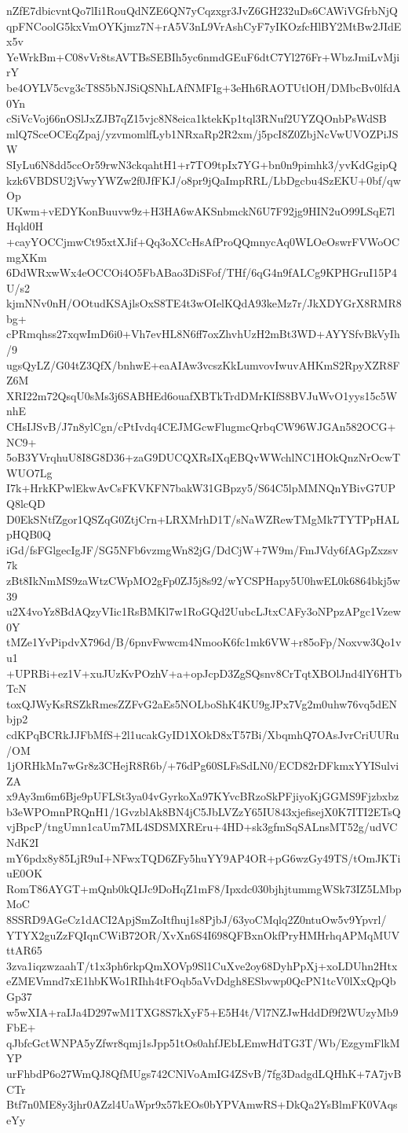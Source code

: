 nZfE7dbicvntQo7lIi1RouQdNZE6QN7yCqzxgr3JvZ6GH232uDs6CAWiVGfrbNjQ
qpFNCoolG5kxVmOYKjmz7N+rA5V3nL9VrAshCyF7yIKOzfcHlBY2MtBw2JIdEx5v
YeWrkBm+C08vVr8tsAVTBsSEBIh5yc6nmdGEuF6dtC7Yl276Fr+WbzJmiLvMjirY
be4OYLV5cvg3cT8S5bNJSiQSNhLAfNMFIg+3eHh6RAOTUtlOH/DMbcBv0lfdA0Yn
cSiVcVoj66nOSlJxZJB7qZ15vjc8N8eica1ktekKp1tql3RNuf2UYZQOnbPsWdSB
mlQ7SceOCEqZpaj/yzvmomlfLyb1NRxaRp2R2xm/j5pcI8Z0ZbjNcVwUVOZPiJSW
SIyLu6N8dd5ccOr59rwN3ckqahtH1+r7TO9tpIx7YG+bn0n9pimhk3/yvKdGgipQ
kzk6VBDSU2jVwyYWZw2f0JfFKJ/o8pr9jQaImpRRL/LbDgcbu4SzEKU+0bf/qwOp
UKwm+vEDYKonBuuvw9z+H3HA6wAKSnbmckN6U7F92jg9HIN2uO99LSqE7lHqld0H
+cayYOCCjmwCt95xtXJif+Qq3oXCcHsAfProQQmnycAq0WLOeOswrFVWoOCmgXKm
6DdWRxwWx4eOCCOi4O5FbABao3DiSFof/THf/6qG4n9fALCg9KPHGruI15P4U/s2
kjmNNv0nH/OOtudKSAjlsOxS8TE4t3wOIelKQdA93keMz7r/JkXDYGrX8RMR8bg+
cPRmqhss27xqwImD6i0+Vh7evHL8N6ff7oxZhvhUzH2mBt3WD+AYYSfvBkVyIh/9
ugsQyLZ/G04tZ3QfX/bnhwE+eaAIAw3vcszKkLumvovIwuvAHKmS2RpyXZR8FZ6M
XRI22m72QsqU0sMs3j6SABHEd6ouafXBTkTrdDMrKIfS8BVJuWvO1yys15c5WnhE
CHsIJSvB/J7n8ylCgn/cPtIvdq4CEJMGcwFlugmcQrbqCW96WJGAn582OCG+NC9+
5oB3YVrqhuU8I8G8D36+zaG9DUCQXRsIXqEBQvWWchlNC1HOkQnzNrOcwTWUO7Lg
I7k+HrkKPwlEkwAvCsFKVKFN7bakW31GBpzy5/S64C5lpMMNQnYBivG7UPQ8lcQD
D0EkSNtfZgor1QSZqG0ZtjCrn+LRXMrhD1T/sNaWZRewTMgMk7TYTPpHALpHQB0Q
iGd/fsFGlgecIgJF/SG5NFb6vzmgWn82jG/DdCjW+7W9m/FmJVdy6fAGpZxzsv7k
zBt8IkNmMS9zaWtzCWpMO2gFp0ZJ5j8s92/wYCSPHapy5U0hwEL0k6864bkj5w39
u2X4voYz8BdAQzyVIic1RsBMKl7w1RoGQd2UubcLJtxCAFy3oNPpzAPgc1Vzew0Y
tMZe1YvPipdvX796d/B/6pnvFwwcm4NmooK6fc1mk6VW+r85oFp/Noxvw3Qo1vu1
+UPRBi+ez1V+xuJUzKvPOzhV+a+opJcpD3ZgSQsnv8CrTqtXBOlJnd4lY6HTbTcN
toxQJWyKsRSZkRmesZZFvG2aEs5NOLboShK4KU9gJPx7Vg2m0uhw76vq5dENbjp2
cdKPqBCRkJJFbMfS+2l1ucakGyID1XOkD8xT57Bi/XbqmhQ7OAsJvrCriUURu/OM
1jORHkMn7wGr8z3CHejR8R6b/+76dPg60SLFsSdLN0/ECD82rDFkmxYYISulviZA
x9Ay3m6m6Bje9pUFLSt3ya04vGyrkoXa97KYvcBRzoSkPFjiyoKjGGMS9Fjzbxbz
b3eWPOmnPRQnH1/1GvzblAk8BN4jC5JbLVZzY65IU843xjefisejX0K7ITI2ETsQ
vjBpcP/tngUmn1caUm7ML4SDSMXREru+4HD+sk3gfmSqSALnsMT52g/udVCNdK2I
mY6pdx8y85LjR9uI+NFwxTQD6ZFy5huYY9AP4OR+pG6wzGy49TS/tOmJKTiuE0OK
RomT86AYGT+mQnb0kQIJc9DoHqZ1mF8/Ipxdc030bjhjtummgWSk73IZ5LMbpMoC
8SSRD9AGeCz1dACI2ApjSmZoItfhuj1s8PjbJ/63yoCMqlq2Z0ntuOw5v9Ypvrl/
YTYX2guZzFQIqnCWiB72OR/XvXn6S4I698QFBxnOkfPryHMHrhqAPMqMUVttAR65
3zva1iqzwzaahT/t1x3ph6rkpQmXOVp9Sl1CuXve2oy68DyhPpXj+xoLDUhn2Htx
eZMEVmnd7xE1hbKWo1RIhh4tFOqb5aVvDdgh8ESbvwp0QcPN1tcV0lXxQpQbGp37
w5wXIA+raIJa4D297wM1TXG8S7kXyF5+E5H4t/Vl7NZJwHddDf9f2WUzyMb9FbE+
qJbfcGctWNPA5yZfwr8qmj1sJpp51tOs0ahfJEbLEmwHdTG3T/Wb/EzgymFlkMYP
urFhbdP6o27WmQJ8QfMUgs742CNlVoAmIG4ZSvB/7fg3DadgdLQHhK+7A7jvBCTr
Btf7n0ME8y3jhr0AZzl4UaWpr9x57kEOs0bYPVAmwRS+DkQa2YsBlmFK0VAqseYy
